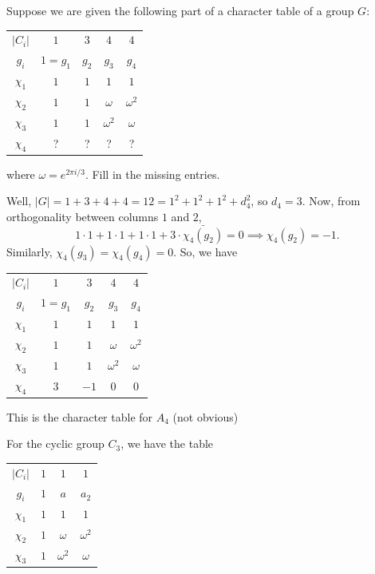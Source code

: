 \begin{ex}
    Suppose we are given the following part of a character table of a group $G$:

    \begin{tabular}{c|cccc}
            $|C_i|$ & $1$ & $3$ & $4$ & $4$ \\
            $g_i$ & $1=g_1$ & $g_2$ & $g_3$ &$g_4$ \\ \hline
           $\chi_1$  & $1$ & $1$ & $1$ & $1$\\
            $\chi_2$ & $1$ & $1$ &$\omega$  & $\omega^2$ \\
           $\chi_3$  & $1$ & $1$ & $\omega^2$ & $\omega$ \\
           $\chi_4$  & ? & ? & ? & ? \\
        \end{tabular}

        where $\omega = e^{2\pi i /3}.$ Fill in the missing entries.

        Well, $|G| = 1+3+4+4=12=1^2+1^2+1^2 +d_4^2$, so $d_4=3$. Now, from orthogonality between columns $1$ and $2$,
        $$1 \cdot 1  + 1 \cdot 1 + 1 \cdot 1 + 3 \cdot \bar{\chi_4(g_2)}=0 \implies \chi_4(g_2)=-1.$$
        Similarly, $\chi _4(g_3)=\chi_4(g_4)=0.$ So, we have

    \begin{tabular}{c|cccc}
            $|C_i|$ & $1$ & $3$ & $4$ & $4$ \\
            $g_i$ & $1=g_1$ & $g_2$ & $g_3$ &$g_4$ \\ \hline
           $\chi_1$  & $1$ & $1$ & $1$ & $1$\\
            $\chi_2$ & $1$ & $1$ &$\omega$  & $\omega^2$ \\
           $\chi_3$  & $1$ & $1$ & $\omega^2$ & $\omega$ \\
           $\chi_4$  & $3$ & $-1$ & $0$ & $0$ \\
        \end{tabular}

        This is the character table for $A_4$ (not obvious)
\end{ex}

\begin{ex}
    For the cyclic group $C_3$, we have the table

    \begin{tabular}{c|ccc}
           $|C_i|$  & $1$ & $1$ & $1$ \\
            $g_i$ & $1$ & $a$ & $a_2$ \\ \hline
             $\chi_1$ & $1$ & $1$ & $1$ \\
            $\chi_2$ & $1$ & $\omega$  & $\omega^2$ \\
            $\chi_3$ & $1$ & $\omega^2$  & $\omega$\\
        \end{tabular}
\end{ex}

